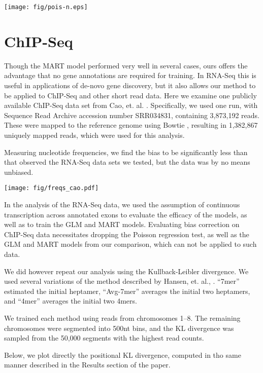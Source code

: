 \documentclass[letterpaper]{article}
\begin{document}
\texttt{[image: fig/pois-n.eps]}



\section{ChIP-Seq}

Though the MART model \cite{Li2010} performed very well in several cases, ours
offers the advantage that no gene annotations are required for training.  In
RNA-Seq this is useful in applications of de-novo gene discovery, but it also
allows our method to be applied to ChIP-Seq and other short read data. Here we
examine one publicly available ChIP-Seq data set from Cao, et. al.
\cite{Cao2010}. Specifically, we used one run, with Sequence Read Archive
accession number SRR034831, containing 3,873,192 reads. These were mapped to the
reference genome using Bowtie \cite{Langmead2009}, resulting in 1,382,867
uniquely mapped reads, which were used for this analysis.

Measuring nucleotide frequencies, we find the bias to be significantly less
than that observed the RNA-Seq data sets we tested, but the data was by no means
unbiased.

\begin{center}
\texttt{[image: fig/freqs\_cao.pdf]}
\end{center}

In the analysis of the RNA-Seq data, we used the assumption of continuous
transcription across annotated exons to evaluate the efficacy of the models, as
well as to train the GLM and MART models. Evaluating bias correction on ChIP-Seq
data necessitates dropping the Poisson regression test, as well as the GLM and
MART models from our comparison, which can not be applied to such data.

We did however repeat our analysis using the Kullback-Leibler divergence.
We used several variations of the method described by Hansen, et. al.,
\cite{Hansen2010}. ``7mer'' estimated the initial heptamer, ``Avg-7mer''
averages the initial two heptamers, and ``4mer'' averages the initial two 4mers.

We trained each method using reads from chromosomes 1--8. The
remaining chromosomes were segmented into 500nt bins, and the KL divergence was
sampled from the 50,000 segments with the highest read counts.

Below, we plot directly the positional KL divergence, computed in tho same
manner described in the Results section of the paper.
\end{document}
